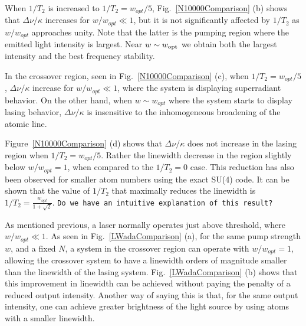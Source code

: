 \documentclass[aps,
twocolumn,
superscriptaddress,groupedaddress]{revtex4}
\newcommand{\dmcomment}[1]{{\tt #1}}
\begin{document}
{When $1/T_2$ is increased to $1/T_2=w_{opt}/5$,
Fig.~\ref{N10000Comparison} (b) shows that $\Delta \nu/\kappa$ increases
for $w/w_{opt}\ll 1$, but it is not significantly affected by $1/T_2$ as
$w/w_{opt}$ approaches unity.  Note that the latter is the pumping
region where the emitted light intensity is largest.  Near $w\sim w_{\rm
opt}$ we obtain both the largest intensity and the best frequency
stability.

In the crossover region, seen in Fig.~\ref{N10000Comparison} (c), when
$1/T_2=w_{opt}/5$, $\Delta \nu/\kappa$ increase for $w/w_{opt}\ll 1$,
where the system is displaying superradiant behavior.  On the other
hand, when $w \sim w_{opt}$ where the
system starts to display lasing behavior, $\Delta\nu/\kappa$ is
insensitive to the inhomogeneous broadening of the atomic line.

Figure~\ref{N10000Comparison} (d) shows that $\Delta \nu/\kappa$ does
not increase in the lasing region when $1/T_2=w_{opt}/5$.  Rather the
linewidth decrease in the region slightly below $w/w_{opt}=1$, when
compared to the $1/T_2=0$ case. This reduction has also been observed
for smaller atom numbers using the exact SU(4) code. It can be shown
that the value of $1/T_2$ that maximally reduces the linewidth is
$1/T_2=\frac{w_{opt}}{1+\sqrt{2}}$.
\dmcomment{Do we have an intuitive explanation of this result?}

As mentioned previous, a laser normally operates just above threshold,
where $w/w_{opt} \ll 1$. As seen in Fig.~\ref{LWadaComparison} (a), for
the same pump strength $w$, and a fixed $N$, a system in the crossover
region can operate with $w/w_{opt} = 1$, allowing the crossover system
to have a linewidth orders of magnitude smaller than the linewidth of
the lasing system.  Fig.~\ref{LWadaComparison} (b) shows that this
improvement in linewidth can be achieved without paying the penalty of a
reduced output intensity.  Another way of saying this is that, for the
same output intensity, one can achieve greater brightness of the light
source by using atoms with a smaller linewidth.

}
\end{document}
